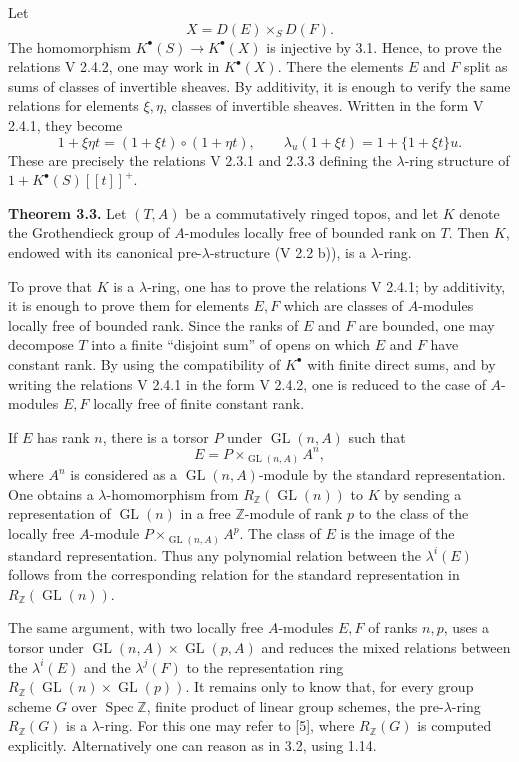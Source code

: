\documentclass[11pt]{article}
\newcommand{\Spec}{\operatorname{Spec}}
\providecommand{\GL}{\operatorname{GL}}
\begin{document}
Let
\[
  X=D(E)\times_S D(F).
\]
The homomorphism \(K^\bullet(S)\to K^\bullet(X)\) is injective by 3.1. Hence, to prove the relations V 2.4.2, one may work in \(K^\bullet(X)\). There the elements \(E\) and \(F\) split as sums of classes of invertible sheaves. By additivity, it is enough to verify the same relations for elements \(\xi,\eta\), classes of invertible sheaves. Written in the form V 2.4.1, they become
\[
  1+\xi\eta t=(1+\xi t)\circ(1+\eta t),
  \qquad
  \lambda_u(1+\xi t)=1+\{1+\xi t\}u .
\]
These are precisely the relations V 2.3.1 and 2.3.3 defining the \(\lambda\)-ring structure of \(1+K^\bullet(S)[[t]]^+\).

\textbf{Theorem 3.3.} Let \((T,A)\) be a commutatively ringed topos, and let \(K\) denote the Grothendieck group of \(A\)-modules locally free of bounded rank on \(T\). Then \(K\), endowed with its canonical pre-\(\lambda\)-structure (V 2.2 b)), is a \(\lambda\)-ring.

To prove that \(K\) is a \(\lambda\)-ring, one has to prove the relations V 2.4.1; by additivity, it is enough to prove them for elements \(E,F\) which are classes of \(A\)-modules locally free of bounded rank. Since the ranks of \(E\) and \(F\) are bounded, one may decompose \(T\) into a finite ``disjoint sum'' of opens on which \(E\) and \(F\) have constant rank. By using the compatibility of \(K^\bullet\) with finite direct sums, and by writing the relations V 2.4.1 in the form V 2.4.2, one is reduced to the case of \(A\)-modules \(E,F\) locally free of finite constant rank.

If \(E\) has rank \(n\), there is a torsor \(P\) under \(\GL(n,A)\) such that
\[
  E=P\times_{\GL(n,A)} A^n,
\]
where \(A^n\) is considered as a \(\GL(n,A)\)-module by the standard representation. One obtains a \(\lambda\)-homomorphism from \(R_{\mathbb Z}(\GL(n))\) to \(K\) by sending a representation of \(\GL(n)\) in a free \(\mathbb Z\)-module of rank \(p\) to the class of the locally free \(A\)-module \(P\times_{\GL(n,A)}A^p\). The class of \(E\) is the image of the standard representation. Thus any polynomial relation between the \(\lambda^i(E)\) follows from the corresponding relation for the standard representation in \(R_{\mathbb Z}(\GL(n))\).

The same argument, with two locally free \(A\)-modules \(E,F\) of ranks \(n,p\), uses a torsor under \(\GL(n,A)\times\GL(p,A)\) and reduces the mixed relations between the \(\lambda^i(E)\) and the \(\lambda^j(F)\) to the representation ring \(R_{\mathbb Z}(\GL(n)\times\GL(p))\). It remains only to know that, for every group scheme \(G\) over \(\Spec\mathbb Z\), finite product of linear group schemes, the pre-\(\lambda\)-ring \(R_{\mathbb Z}(G)\) is a \(\lambda\)-ring. For this one may refer to [5], where \(R_{\mathbb Z}(G)\) is computed explicitly. Alternatively one can reason as in 3.2, using 1.14.
\end{document}
